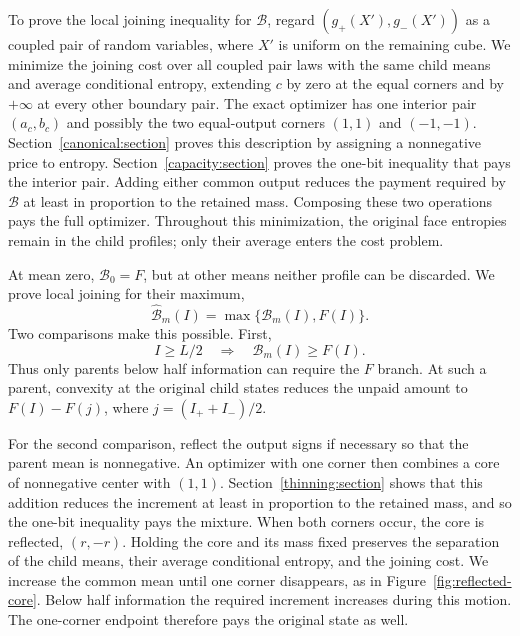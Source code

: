 \documentclass[11pt]{article}
\theoremstyle{definition}
\theoremstyle{remark}
\numberwithin{equation}{section}
\begin{document}
To prove the local joining inequality for $\mathcal B$, regard
$(g_+(X'),g_-(X'))$ as a coupled pair
of random variables, where $X'$ is uniform on the remaining cube.
We minimize the joining cost over all coupled pair laws with the same
child means and average conditional entropy, extending $c$ by zero at
the equal corners and by $+\infty$ at every other boundary pair.
The exact optimizer has one interior pair $(a_c,b_c)$ and possibly
the two equal-output corners $(1,1)$ and $(-1,-1)$.
Section~\ref{canonical:section} proves this description by assigning a
nonnegative price to entropy. Section~\ref{capacity:section} proves the
one-bit inequality that pays the interior pair. Adding either common
output reduces the payment required by $\mathcal B$ at least in
proportion to the retained mass. Composing these two operations pays
the full optimizer. Throughout this minimization, the original face
entropies remain in the child profiles; only their average enters the
cost problem.

At mean zero, $\mathcal B_0=F$, but at other means neither profile
can be discarded. We prove local joining for their maximum,
\begin{equation}
 \widehat{\mathcal B}_m(I)
 =\max\{\mathcal B_m(I),F(I)\}.
 \label{main:hybrid-profile}
\end{equation}
Two comparisons make this possible. First,
\begin{equation}
 I\ge L/2\quad\Longrightarrow\quad
 \mathcal B_m(I)\ge F(I).
 \label{main:threshold}
\end{equation}
Thus only parents below half information can require the $F$ branch.
At such a parent, convexity at the original child states reduces the
unpaid amount to $F(I)-F(j)$, where $j=(I_++I_-)/2$.

For the second comparison, reflect the output signs if necessary so
that the parent mean is nonnegative. An optimizer with one corner then
combines a core of nonnegative center with $(1,1)$.
Section~\ref{thinning:section} shows that this addition reduces the
increment at least in proportion to the retained mass, and so the
one-bit inequality pays the mixture. When both corners occur, the core
is reflected, $(r,-r)$. Holding the core and its mass fixed preserves the separation of the
child means, their average conditional entropy, and the joining cost.
We increase the common mean until one corner disappears, as in
Figure~\ref{fig:reflected-core}. Below half information the required
increment increases during this motion. The one-corner endpoint
therefore pays the original state as well.
\end{document}
